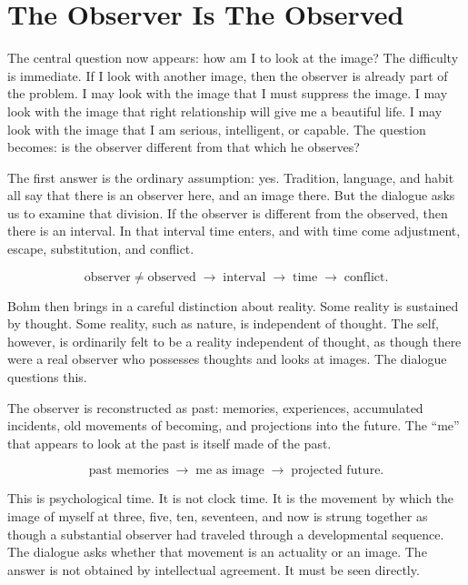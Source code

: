 \section{The Observer Is The Observed}

The central question now appears: how am I to look at the image? The difficulty is immediate. If I look with another image, then the observer is already part of the problem. I may look with the image that I must suppress the image. I may look with the image that right relationship will give me a beautiful life. I may look with the image that I am serious, intelligent, or capable. The question becomes: is the observer different from that which he observes?

The first answer is the ordinary assumption: yes. Tradition, language, and habit all say that there is an observer here, and an image there. But the dialogue asks us to examine that division. If the observer is different from the observed, then there is an interval. In that interval time enters, and with time come adjustment, escape, substitution, and conflict.

\begin{equation}
\text{observer} \neq \text{observed}
\;\longrightarrow\;
\text{interval}
\;\longrightarrow\;
\text{time}
\;\longrightarrow\;
\text{conflict}.
\end{equation}

Bohm then brings in a careful distinction about reality. Some reality is sustained by thought. Some reality, such as nature, is independent of thought. The self, however, is ordinarily felt to be a reality independent of thought, as though there were a real observer who possesses thoughts and looks at images. The dialogue questions this.

The observer is reconstructed as past: memories, experiences, accumulated incidents, old movements of becoming, and projections into the future. The ``me'' that appears to look at the past is itself made of the past.

\begin{equation}
\text{past memories}
\;\longrightarrow\;
\text{me as image}
\;\longrightarrow\;
\text{projected future}.
\end{equation}

This is psychological time. It is not clock time. It is the movement by which the image of myself at three, five, ten, seventeen, and now is strung together as though a substantial observer had traveled through a developmental sequence. The dialogue asks whether that movement is an actuality or an image. The answer is not obtained by intellectual agreement. It must be seen directly.

